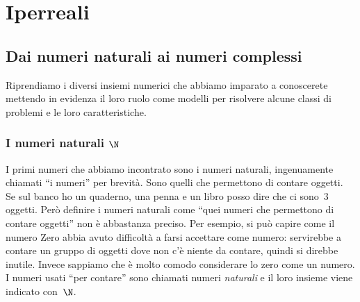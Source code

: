 



\chapter{Iperreali}

\section{Dai numeri naturali ai numeri complessi} 
\label{sec:iperreali:01_introduzione}

Riprendiamo i diversi insiemi numerici che abbiamo imparato a conoscerete 
mettendo in evidenza il loro ruolo come modelli per risolvere alcune classi di 
problemi e le loro caratteristiche.

\subsection{I numeri naturali \(\N\)} 
\label{subsec:insnum_naturali}

I primi numeri che abbiamo incontrato sono i numeri naturali, ingenuamente 
chiamati ``i numeri'' per brevità. Sono quelli che permettono di contare 
oggetti. Se sul banco ho un quaderno, una penna e un libro 
posso dire che ci sono~3 oggetti. Però definire i numeri naturali come ``quei 
numeri che permettono di contare oggetti'' non è abbastanza preciso. Per 
esempio, si può capire come il numero Zero abbia avuto difficoltà a farsi 
accettare come numero: servirebbe a contare un gruppo di oggetti dove non c'è
niente da contare, quindi si direbbe inutile. Invece sappiamo che è molto comodo 
considerare lo zero come un numero. I numeri usati ``per contare'' sono chiamati
numeri \emph{naturali} e il loro insieme viene indicato con~\(\N\).


